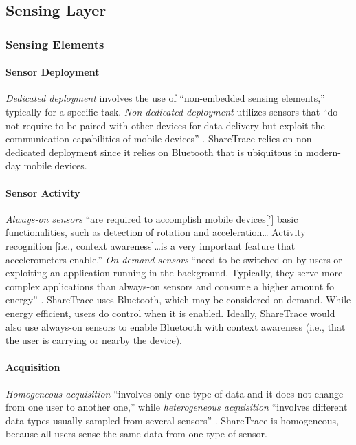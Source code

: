 \subsection{Sensing Layer}

\subsubsection{Sensing Elements}

\paragraph{Sensor Deployment}

\emph{Dedicated deployment} involves the use of ``non-embedded sensing elements,'' typically for a specific task. \emph{Non-dedicated deployment} utilizes sensors that ``do not require to be paired with other devices for data delivery but exploit the communication capabilities of mobile devices'' \citep{Capponi2019}. ShareTrace relies on non-dedicated deployment since it relies on Bluetooth that is ubiquitous in modern-day mobile devices.

\paragraph{Sensor Activity}

\emph{Always-on sensors} ``are required to accomplish mobile devices['] basic functionalities, such as detection of rotation and acceleration{\ldots} Activity recognition [i.e., context awareness]{\ldots}is a very important feature that accelerometers enable.'' \emph{On-demand sensors} ``need to be switched on by users or exploiting an application running in the background. Typically, they serve more complex applications than always-on sensors and consume a higher amount fo energy'' \citep{Capponi2019}. ShareTrace uses Bluetooth, which may be considered on-demand. While energy efficient, users do control when it is enabled. Ideally, ShareTrace would also use always-on sensors to enable Bluetooth with context awareness (i.e., that the user is carrying or nearby the device).

\paragraph{Acquisition}

\emph{Homogeneous acquisition} ``involves only one type of data and it does not change from one user to another one,'' while \emph{heterogeneous acquisition} ``involves different data types usually sampled from several sensors'' \citep{Capponi2019}. ShareTrace is homogeneous, because all users sense the same data from one type of sensor.

